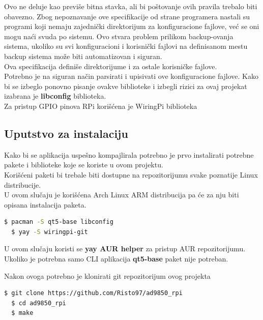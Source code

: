 Ovo ne deluje kao previše bitna stavka, ali bi poštovanje ovih pravila trebalo
biti obavezno.
Zbog nepoznavanje ove specifikacije od strane programera nastali su programi
koji nemaju zajednički direktorijum za konfiguracione fajlove, već se oni mogu naći
svuda po sistemu.
Ovo stvara problem prilikom backup-ovanja sistema, ukoliko su svi konfiguracioni
i korisnički fajlovi na definisanom mestu backup sistema može biti automatizovan i siguran. \\
Ova specifikacija definiše direktorijume i za ostale korisničke fajlove. \\

Potrebno je na siguran način parsirati i upisivati ove konfiguracione fajlove.
Kako bi se izbeglo ponovno pisanje ovakve biblioteke i izbegli rizici za ovaj projekat izabrana je \textbf{libconfig}\cite{libconfig} biblioteka.\\

Za pristup GPIO pinova RPi korišćena je WiringPi\cite{WiringPi} biblioteka

\subsection{Uputstvo za instalaciju}

Kako bi se aplikacija uspešno kompajlirala potrebno je prvo instalirati potrebne
pakete i biblioteke koje se koriste u ovom projektu. \\
Korišćeni paketi bi trebale biti dostupne na repozitorijumu svake poznatije Linux
distribucije. \\
U ovom slučaju je korišćena Arch Linux ARM distribucija pa će za nju biti
opisana instalacija paketa.

\begin{lstlisting}[language=bash, basicstyle=\normalsize]
  $ pacman -S qt5-base libconfig
  $ yay -S wiringpi-git
\end{lstlisting}

U ovom slučaju koristi se \textbf{yay AUR helper} za pristup AUR repozitorijumu.
Ukoliko je potrebna samo CLI aplikacija \textbf{qt5-base} paket nije potreban.\\
\newpage

Nakon ovoga potrebno je klonirati git repozitorijum ovog projekta

\begin{lstlisting}[language=bash, basicstyle=\normalsize]
  $ git clone https://github.com/Risto97/ad9850_rpi
  $ cd ad9850_rpi
  $ make
\end{lstlisting} %

